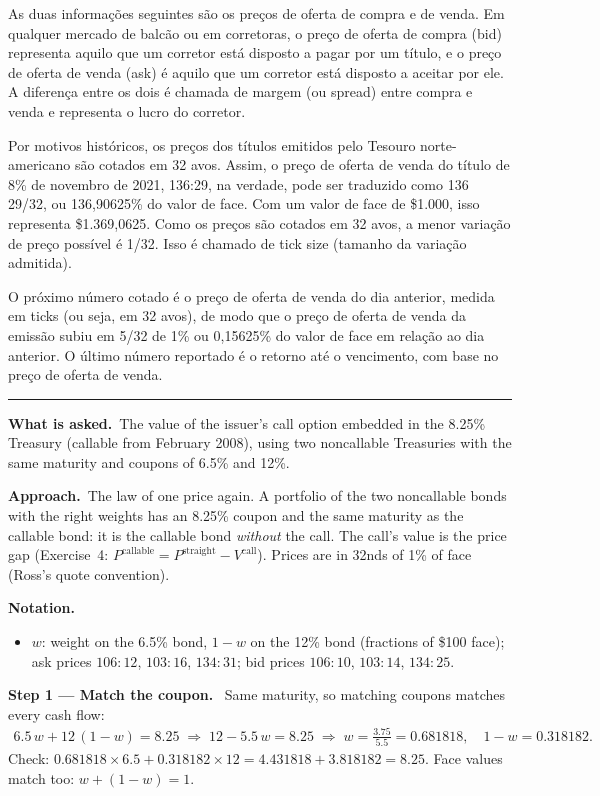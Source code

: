 \documentclass[11pt,a4paper]{article}
\newcommand{\notation}{\par\noindent\textbf{Notation.}}
\newcommand{\step}[2]{\par\medskip\noindent\textbf{Step #1 --- #2.}~}
\newcommand{\asked}{\par\medskip\noindent\textbf{What is asked.}~}
\newcommand{\approach}{\par\smallskip\noindent\textbf{Approach.}~}
\newcommand{\stmtend}{\par\endgroup\nopagebreak\noindent\rule{\linewidth}{0.4pt}\par\medskip}
\begin{document}
As duas informações seguintes são os preços de oferta de compra e de venda. Em qualquer mercado de
balcão ou em corretoras, o preço de oferta de compra (bid) representa aquilo que um corretor está
disposto a pagar por um título, e o preço de oferta de venda (ask) é aquilo que um corretor está
disposto a aceitar por ele. A diferença entre os dois é chamada de margem (ou spread) entre compra e
venda e representa o lucro do corretor.

Por motivos históricos, os preços dos títulos emitidos pelo Tesouro norte-americano são cotados em
32 avos. Assim, o preço de oferta de venda do título de 8\% de novembro de 2021, 136:29, na verdade,
pode ser traduzido como 136 29/32, ou 136,90625\% do valor de face. Com um valor de face de \$1.000,
isso representa \$1.369,0625. Como os preços são cotados em 32 avos, a menor variação de preço
possível é 1/32. Isso é chamado de tick size (tamanho da variação admitida).

O próximo número cotado é o preço de oferta de venda do dia anterior, medida em ticks (ou seja, em
32 avos), de modo que o preço de oferta de venda da emissão subiu em 5/32 de 1\% ou 0,15625\% do
valor de face em relação ao dia anterior. O último número reportado é o retorno até o vencimento,
com base no preço de oferta de venda.
\stmtend

\asked The value of the issuer's call option embedded in the 8.25\% Treasury (callable from February 2008), using two noncallable
Treasuries with the same maturity and coupons of 6.5\% and 12\%.

\approach The law of one price again. A portfolio of the two noncallable bonds with the right weights has an 8.25\% coupon and the
same maturity as the callable bond: it is the callable bond \emph{without} the call. The call's value is the price gap
(Exercise~4: $P^{\text{callable}}=P^{\text{straight}}-V^{\text{call}}$). Prices are in 32nds of 1\% of face (Ross's quote convention).

\notation
\begin{itemize}
  \item $w$: weight on the 6.5\% bond, $1-w$ on the 12\% bond (fractions of \$100 face); ask prices $106{:}12$, $103{:}16$, $134{:}31$; bid prices $106{:}10$, $103{:}14$, $134{:}25$.
\end{itemize}

\step{1}{Match the coupon} Same maturity, so matching coupons matches every cash flow:
\begin{align}
  6.5\,w + 12\,(1-w) = 8.25 \;\Longrightarrow\; 12-5.5\,w = 8.25 \;\Longrightarrow\; w = \frac{3.75}{5.5} = 0.681818,\quad 1-w = 0.318182. \label{r2be14-w}
\end{align}
Check: $0.681818\times6.5+0.318182\times12 = 4.431818+3.818182 = 8.25$. Face values match too: $w+(1-w)=1$.
\end{document}
